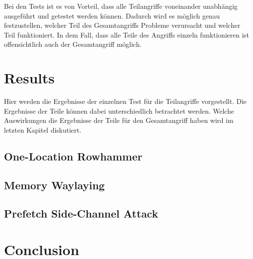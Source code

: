 \documentclass[conference]{IEEEtran}
\newcounter{todocnt}
\newcommand{\todo}[1]{\stepcounter{todocnt}{\tt {[#1]}} \marginpar{{$\blacksquare$ \thetodocnt}}}
\begin{document}
Bei den Tests ist es von Vorteil, dass alle Teilangriffe voneinander unabhängig ausgeführt und getestet werden können. Dadurch wird es möglich genau festzustellen, welcher Teil des Gesamtangriffs Probleme verursacht und welcher Teil funktioniert. In dem Fall, dass alle Teile des Angriffs einzeln funktionieren ist offensichtlich auch der Gesamtangriff möglich.



\section{Results}
Hier werden die Ergebnisse der einzelnen Test für die Teilangriffe vorgestellt. Die Ergebnisse der Teile können dabei unterschiedlich betrachtet werden. Welche Auswirkungen die Ergebnisse der Teile für den Gesamtangriff haben wird im letzten Kapitel diskutiert.

\subsection{One-Location Rowhammer}


\subsection{Memory Waylaying}


\subsection{Prefetch Side-Channel Attack}


\section{Conclusion}
\todo{TBD last}




%
{}
%
\end{document}
